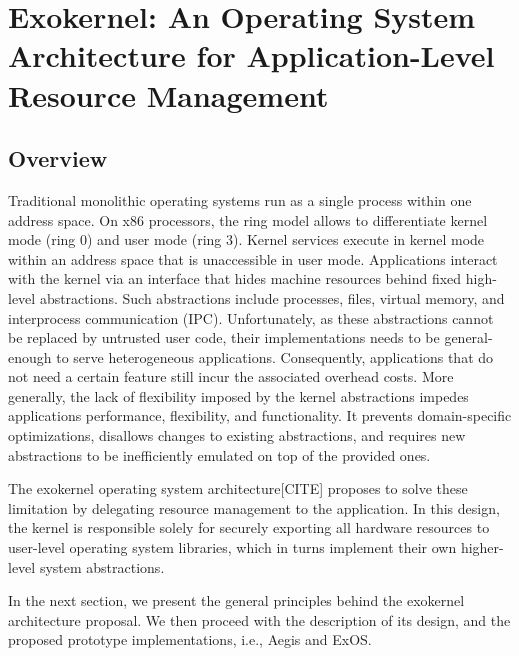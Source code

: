\section{Exokernel: An Operating System Architecture for Application-Level Resource Management}

\subsection{Overview}
Traditional monolithic operating systems run as a single process within one address space.
On x86 processors, the ring model allows to differentiate kernel mode (ring 0) and user mode (ring 3).
Kernel services execute in kernel mode within an address space that is unaccessible in user mode.
Applications interact with the kernel via an interface that hides machine resources behind fixed high-level abstractions.
Such abstractions include processes, files, virtual memory, and interprocess communication (IPC).
Unfortunately, as these abstractions cannot be replaced by untrusted user code, their implementations needs to be general-enough to serve heterogeneous applications.
Consequently, applications that do not need a certain feature still incur the associated overhead costs.
More generally, the lack of flexibility imposed by the kernel abstractions impedes applications performance, flexibility, and functionality.
It prevents domain-specific optimizations, disallows changes to existing abstractions, and requires new abstractions to be inefficiently emulated on top of the provided ones.

The exokernel operating system architecture[CITE] proposes to solve these limitation by delegating resource management to the application.
In this design, the kernel is responsible solely for securely exporting all hardware resources to user-level operating system libraries, which in turns implement their own higher-level system abstractions.

In the next section, we present the general principles behind the exokernel architecture proposal.
We then proceed with the description of its design, and the proposed prototype implementations, i.e., Aegis and ExOS.
%
%
% 
%
%
%
%
%
